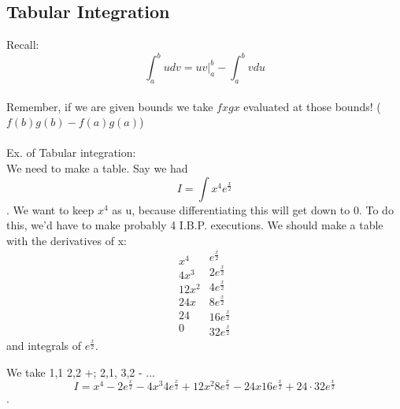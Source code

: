 \documentclass[twocolumn, 12pt]{report}
\begin{document}
   \subsection{Tabular Integration}
   Recall:
   $$\int_a^b u dv = uv|^b_a - \int_a^b v du$$\\
   Remember, if we are given bounds we take $fxgx$ evaluated at those bounds! ($f(b)g(b) - f(a)g(a)$)\\\\
   Ex. of Tabular integration:\\ We need to make a table. Say we had $$I = \int x^4 e^\frac{x}{2}$$. We want to keep $x^4$ as u, because differentiating this will get down to $0$. To do this, we'd have to make probably 4 I.B.P. executions. We should make a table with the derivatives of x:
   $$\begin{matrix}x^4 \\ 4x^3 \\ 12x^2 \\ 24 x \\ 24 \\ 0\end{matrix}\begin{matrix}e^\frac{x}{2} \\ 2e^\frac{x}{2} \\ 4e^\frac{x}{2} \\ 8e^\frac{x}{2} \\ 16e^\frac{x}{2} \\ 32e^\frac{x}{2}\end{matrix}$$
   and integrals of $e^\frac{x}{2}$.

  We take 1,1 2,2 +; 2,1, 3,2 - ...
  $$I = x^4 -2e^\frac{x}{2} - 4x^3 4e^\frac{x}{2} + 12x^2 8 e^\frac{x}{2}- 24x 16e^\frac{x}{2} + 24 \cdot 32e^\frac{x}{2}$$.
\end{document}
